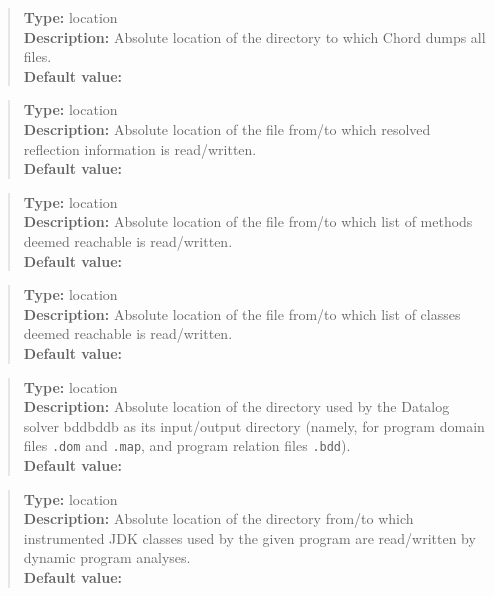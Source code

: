 \begin{quote}
{\bf Type:} location \\
{\bf Description:} Absolute location of the directory to which Chord dumps all files. \\
{\bf Default value:} 
\end{quote}

\begin{quote}
{\bf Type:} location  \\
{\bf Description:} Absolute location of the file from/to which resolved reflection information is read/written. \\
{\bf Default value:} 
\end{quote}

\begin{quote}
{\bf Type:} location  \\
{\bf Description:} Absolute location of the file from/to which list of methods deemed reachable is read/written. \\
{\bf Default value:} 
\end{quote}

\begin{quote}
{\bf Type:} location  \\
{\bf Description:} Absolute location of the file from/to which list of classes deemed reachable is read/written.  \\
{\bf Default value:} 
\end{quote}

\begin{quote}
{\bf Type:} location \\
{\bf Description:} Absolute location of the directory used by the Datalog solver bddbddb as its input/output directory (namely, for program domain files {\tt *.dom} and {\tt *.map}, and program relation files {\tt *.bdd}). \\
{\bf Default value:} 
\end{quote}

\begin{quote}
{\bf Type:} location \\
{\bf Description:} Absolute location of the directory from/to which instrumented JDK classes used by the given program are read/written by dynamic program analyses. \\
{\bf Default value:} 
\end{quote}

